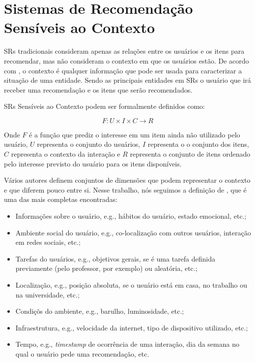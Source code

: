 \section{Sistemas de Recomendação Sensíveis ao Contexto}\label{section:sr-sensivel-contexto}

SRs tradicionais consideram apenas as relações entre os usuários e os itens para recomendar, mas não consideram o
contexto em que os usuários estão. De acordo com , o contexto é qualquer informação
que pode ser usada para caracterizar a situação de uma entidade. Sendo as principais entidades em SRs o usuário que
irá receber uma recomendação e os itens que serão recomendados.

SRs Sensíveis ao Contexto podem ser formalmente definidos como:

\begin{equation}
  F: U \times I \times C \rightarrow R
  \label{eq:context-aware}
\end{equation}

Onde $F$ é a função que prediz o interesse em um item ainda não utilizado pelo usuário, $U$ representa o conjunto do
usuários, $I$ representa o o conjunto dos itens, $C$ representa o contexto da interação e $R$ representa o conjunto de itens
ordenado pelo interesse previsto do usuário para os itens disponíveis.

Vários autores definem conjuntos de dimensões que podem representar o contexto
\cite{schilit1994context, chen2000survey, zimmermann2007operational} e que diferem pouco entre si. Nesse trabalho,
nós seguimos a definição de , que é uma das mais completas encontradas:

\begin{itemize}
\item Informações sobre o usuário, e.g., hábitos do usuário, estado emocional, etc.;
\item Ambiente social do usuário, e.g., co-localização com outros usuários, interação em redes sociais, etc.;
\item Tarefas do usuários, e.g., objetivos gerais, se é uma tarefa definida previamente (pelo professor, por exemplo)
ou aleatória, etc.;
\item Localização, e.g., posição absoluta, se o usuário está em casa, no trabalho ou na universidade, etc.;
\item Condiçõs do ambiente, e.g., barulho, luminosidade, etc.;
\item Infraestrutura, e.g., velocidade da internet, tipo de dispositivo utilizado, etc.;
\item Tempo, e.g., \textit{timestamp} de ocorrência de uma interação, dia da semana no qual o usuário pede uma recomendação, etc.
\end{itemize}

